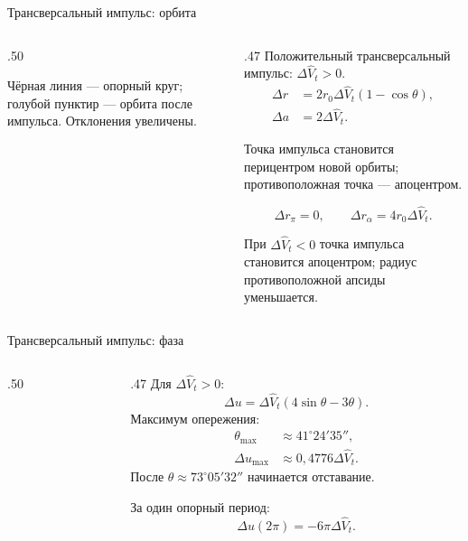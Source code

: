 \documentclass[11pt,aspectratio=169,t]{beamer}
\newcommand{\eqcompact}{\fontsize{10}{12}\selectfont}
\newcommand{\figcaption}[1]{{\usebeamerfont{caption}\color{coursemuted}#1\par}}
\begin{document}
\begin{frame}{Трансверсальный импульс: орбита}
\relax
\begin{columns}[T,onlytextwidth]
\begin{column}{.50\textwidth}
\centering
\figcaption{Чёрная линия --- опорный круг; голубой пунктир --- орбита после импульса. Отклонения увеличены.}
\end{column}
\begin{column}{.47\textwidth}
Положительный трансверсальный импульс: $\Delta\widehat V_t>0$.
{\eqcompact
\setlength{\abovedisplayskip}{3pt}\setlength{\belowdisplayskip}{3pt}
\setlength{\abovedisplayshortskip}{2pt}\setlength{\belowdisplayshortskip}{2pt}
\[
 \begin{aligned}
 \Delta r&=2r_0{\Delta\widehat V_t}(1-\cos\theta),\\
 \Delta a&=2{\Delta\widehat V_t}.
 \end{aligned}
\]
}
{\justifying
Точка импульса становится перицентром новой орбиты; противоположная точка --- апоцентром.\par}
{\eqcompact
\setlength{\abovedisplayskip}{3pt}\setlength{\belowdisplayskip}{3pt}
\setlength{\abovedisplayshortskip}{2pt}\setlength{\belowdisplayshortskip}{2pt}
\[
 \Delta r_\pi=0,\qquad \Delta r_\alpha=4r_0{\Delta\widehat V_t}.
\]
}
{\justifying
При ${\Delta\widehat V_t}<0$ точка импульса становится апоцентром; радиус противоположной апсиды уменьшается.\par}
\end{column}
\end{columns}
\end{frame}

\begin{frame}{Трансверсальный импульс: фаза}
\relax
\begin{columns}[T,onlytextwidth]
\begin{column}{.50\textwidth}
\centering
\end{column}
\begin{column}{.47\textwidth}
Для $\Delta\widehat V_t>0$:
{\eqcompact
\setlength{\abovedisplayskip}{3pt}\setlength{\belowdisplayskip}{3pt}
\setlength{\abovedisplayshortskip}{2pt}\setlength{\belowdisplayshortskip}{2pt}
\[
 \Delta u={\Delta\widehat V_t}(4\sin\theta-3\theta).
\]
}
Максимум опережения:
{\eqcompact
\setlength{\abovedisplayskip}{3pt}\setlength{\belowdisplayskip}{3pt}
\setlength{\abovedisplayshortskip}{2pt}\setlength{\belowdisplayshortskip}{2pt}
\[
 \begin{aligned}
 \theta_{\max}&\approx41^\circ24'35'',\\[3pt]
 \Delta u_{\max}&\approx0{,}4776\Delta\widehat V_t.
 \end{aligned}
\]
}
После $\theta\approx73^\circ05'32''$ начинается отставание.
\smallskip

За один опорный период:
{\eqcompact
\setlength{\abovedisplayskip}{3pt}\setlength{\belowdisplayskip}{3pt}
\setlength{\abovedisplayshortskip}{2pt}\setlength{\belowdisplayshortskip}{2pt}
\[
 \Delta u(2\pi)=-6\pi {\Delta\widehat V_t}.
\]
}
\end{column}
\end{columns}
\end{frame}
\end{document}
